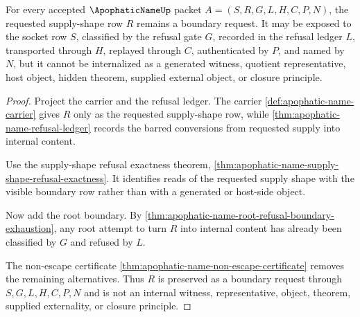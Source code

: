 \begin{theorem}
\label{thm:apophatic-name-supply-shape-noninternalization}
For every accepted $\ApophaticNameUp$ packet $A=(S,R,G,L,H,C,P,N)$, the requested supply-shape row $R$ remains a boundary request. It may be exposed to the socket row $S$, classified by the refusal gate $G$, recorded in the refusal ledger $L$, transported through $H$, replayed through $C$, authenticated by $P$, and named by $N$, but it cannot be internalized as a generated witness, quotient representative, host object, hidden theorem, supplied external object, or closure principle.
\end{theorem}
\begin{proof}
Project the carrier and the refusal ledger. The carrier \autoref{def:apophatic-name-carrier} gives $R$ only as the requested supply-shape row, while \autoref{thm:apophatic-name-refusal-ledger} records the barred conversions from requested supply into internal content.

Use the supply-shape refusal exactness theorem, \autoref{thm:apophatic-name-supply-shape-refusal-exactness}. It identifies reads of the requested supply shape with the visible boundary row rather than with a generated or host-side object.

Now add the root boundary. By \autoref{thm:apophatic-name-root-refusal-boundary-exhaustion}, any root attempt to turn $R$ into internal content has already been classified by $G$ and refused by $L$.

The non-escape certificate \autoref{thm:apophatic-name-non-escape-certificate} removes the remaining alternatives. Thus $R$ is preserved as a boundary request through $S,G,L,H,C,P,N$ and is not an internal witness, representative, object, theorem, supplied externality, or closure principle.
\end{proof}

